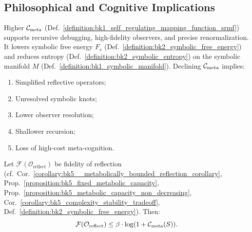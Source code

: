 \subsection{Philosophical and Cognitive Implications}
\label{subsec:bk5_philosophical_and_cognitive_implications}
\begin{scholium} \label{scholium:bk5_metabolic_cost_of_cognition}
Higher $\mathcal{C}_{\text{meta}}$ (Def.~\ref{definition:bk1_self_regulating_mapping_function_srmf})
supports recursive debugging, high-fidelity observers, and precise
renormalization. It lowers symbolic free energy $F_s$
(Def.~\ref{definition:bk2_symbolic_free_energy}) and reduces entropy
(Def.~\ref{definition:bk2_symbolic_entropy}) on the symbolic manifold $M$
(Def.~\ref{definition:bk1_symbolic_manifold}).
Declining $\mathcal{C}_{\text{meta}}$ implies:
\begin{enumerate}
    \item Simplified reflective operators;
    \item Unresolved symbolic knots;
    \item Lower observer resolution;
    \item Shallower recursion;
    \item Loss of high-cost meta-cognition.
\end{enumerate}
\end{scholium}
\begin{theorem} \label{theorem:bk5_metabolic_constraints_reflective_accuracy}
Let $\mathcal{F}(\mathcal{O}_{\text{reflect}})$ be fidelity of reflection (cf.~Cor.~\ref{corollary:bk5__metabolically_bounded_reflection_corollary}, Prop.~\ref{proposition:bk5_fixed_metabolic_capacity}, Prop.~\ref{proposition:bk5_metabolic_capacity_non_decreasing}, Cor.~\ref{corollary:bk5_complexity_stability_tradeoff}, Def.~\ref{definition:bk2_symbolic_free_energy}). Then:
\[
\mathcal{F}(\mathcal{O}_{\text{reflect}}) \leq \beta \cdot \log(1 + \mathcal{C}_{\text{meta}}(S)).
\]
\end{theorem}
